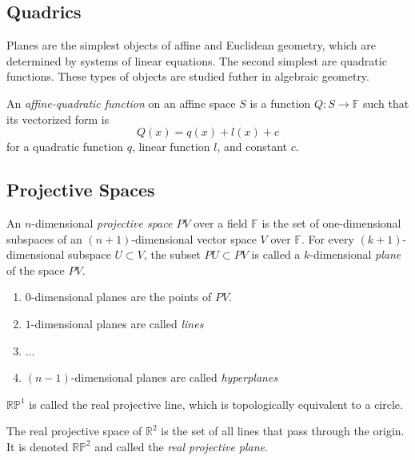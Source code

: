 \documentclass{article}
\begin{document}
  \subsection{Quadrics}

    Planes are the simplest objects of affine and Euclidean geometry, which are determined by systems of linear equations. The second simplest are quadratic functions. These types of objects are studied futher in algebraic geometry. 

    \begin{definition}
    An \textit{affine-quadratic function} on an affine space $S$ is a function $Q: S \longrightarrow \mathbb{F}$ such that its vectorized form is
    \[Q(x) = q(x) + l(x) + c\]
    for a quadratic function $q$, linear function $l$, and constant $c$. 
    \end{definition}

  \subsection{Projective Spaces}

    \begin{definition}
    An $n$-dimensional \textit{projective space $PV$} over a field $\mathbb{F}$ is the set of one-dimensional subspaces of an $(n+1)$-dimensional vector space $V$ over $\mathbb{F}$. For every $(k+1)$-dimensional subspace $U \subset V$, the subset $PU \subset PV$ is called a $k$-dimensional \textit{plane} of the space $PV$. 
    \begin{enumerate}
        \item $0$-dimensional planes are the points of $PV$. 
        \item $1$-dimensional planes are called \textit{lines}
        \item ...
        \item $(n-1)$-dimensional planes are called \textit{hyperplanes}
    \end{enumerate}
    \end{definition}

    \begin{definition}
    $\mathbb{RP}^1$ is called the real projective line, which is topologically equivalent to a circle. 
    \end{definition}

    \begin{example}
    The real projective space of $\mathbb{R}^2$ is the set of all lines that pass through the origin. It is denoted $\mathbb{R P}^2$ and called the \textit{real projective plane}. 
    \end{example}
\end{document}
